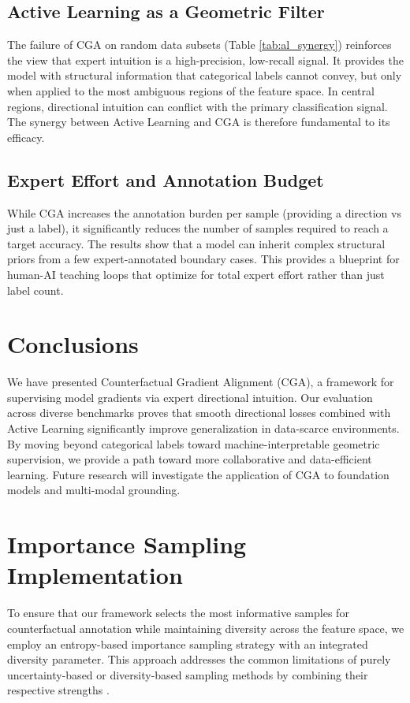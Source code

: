 \documentclass[sigconf,anonymous]{aamas}
\begin{document}
\subsection{Active Learning as a Geometric Filter}
The failure of CGA on random data subsets (Table \ref{tab:al_synergy}) reinforces the view that expert intuition is a high-precision, low-recall signal. It provides the model with structural information that categorical labels cannot convey, but only when applied to the most ambiguous regions of the feature space. In central regions, directional intuition can conflict with the primary classification signal. The synergy between Active Learning and CGA is therefore fundamental to its efficacy.

\subsection{Expert Effort and Annotation Budget}
While CGA increases the annotation burden per sample (providing a direction vs just a label), it significantly reduces the number of samples required to reach a target accuracy. The results show that a model can inherit complex structural priors from a few expert-annotated boundary cases. This provides a blueprint for human-AI teaching loops that optimize for total expert effort rather than just label count.

\section{Conclusions}
We have presented Counterfactual Gradient Alignment (CGA), a framework for supervising model gradients via expert directional intuition. Our evaluation across diverse benchmarks proves that smooth directional losses combined with Active Learning significantly improve generalization in data-scarce environments. By moving beyond categorical labels toward machine-interpretable geometric supervision, we provide a path toward more collaborative and data-efficient learning. Future research will investigate the application of CGA to foundation models and multi-modal grounding.

\balance



\appendix
\section{Importance Sampling Implementation}
To ensure that our framework selects the most informative samples for counterfactual annotation while maintaining diversity across the feature space, we employ an entropy-based importance sampling strategy with an integrated diversity parameter. This approach addresses the common limitations of purely uncertainty-based or diversity-based sampling methods by combining their respective strengths \cite{he2014active,doucet2024bridging}.
\end{document}

